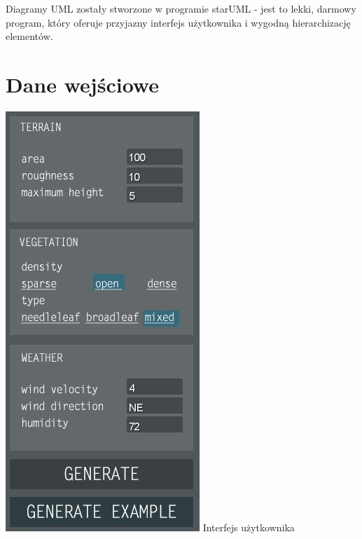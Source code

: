 \documentclass[a4paper, 11pt]{article}
\begin{document}
		Diagramy UML zostały stworzone w programie starUML - jest to lekki, darmowy program, który oferuje przyjazny interfejs użytkownika i wygodną hierarchizację elementów.
	
	
	\section*{Dane wejściowe}
	\indent
	
	\noindent\begin{minipage}{0.4\textwidth}%
		\includegraphics[width=\linewidth]{GUI}
		Interfejs użytkownika
	\end{minipage}%
\end{document}
